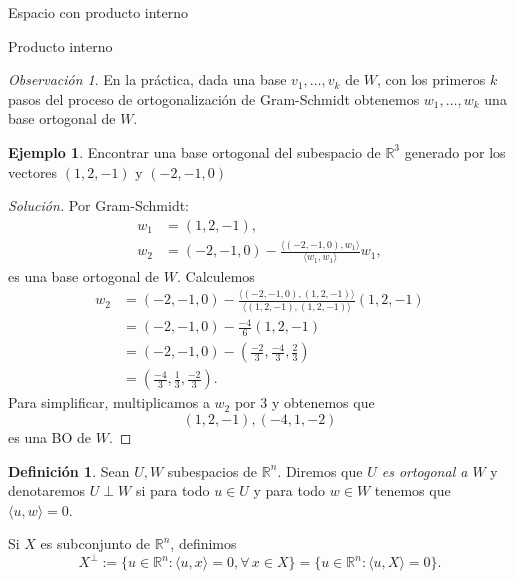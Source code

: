 \documentclass[a4paper,12pt,twoside,spanish,reqno]{amsbook}
\theoremstyle{definition}
\newtheorem{definicion}{Definici\'on}[section]
\newtheorem{ejemplo}{Ejemplo}[section]
\theoremstyle{remark}
\newtheorem{obs}{Observaci\'on}[section]
\newcommand{\la}{\langle}
\newcommand{\ra}{\rangle}
\newcommand{\R}{\mathbb R}
\begin{document}
\begin{chapter}{Espacio con producto interno}
\begin{section}{Producto interno}
\begin{obs}
        En la práctica, dada una base $v_1,\ldots,v_k$ de $W$,  con los primeros $k$ pasos del proceso de ortogonalización de Gram-Schmidt obtenemos $ w_{1},\ldots,w_k $ una base ortogonal de $W$.
        \end{obs}
        
        \begin{ejemplo}
            Encontrar una base ortogonal del subespacio de $\R^3$ generado por los vectores $(1,2,-1)$ y $(-2,-1,0)$
            \begin{proof}[Solución] Por Gram-Schmidt:
                \begin{align*}
                w_1 &= (1,2,-1),  \\
                w_2 &= (-2,-1,0) - \frac{\la (-2,-1,0),w_1\ra}{\la w_1,w_1\ra}w_1,
                \end{align*}
                es una base ortogonal de $W$. Calculemos 
                \begin{align*}
                    w_2  &= (-2,-1,0) - \frac{\la (-2,-1,0),(1,2,-1)\ra}{\la(1,2,-1),(1,2,-1)\ra}(1,2,-1)\\
                    &= (-2,-1,0) - \frac{-4}{6}(1,2,-1) \\
                    &= (-2,-1,0) - (\frac{-2}{3},\frac{-4}{3},\frac{2}{3}) \\
                    &= (\frac{-4}{3},\frac{1}{3},\frac{-2}{3}).
                \end{align*}
                Para simplificar, multiplicamos a $w_2$ por $3$ y obtenemos que
                \begin{equation*}
                    (1,2,-1), (-4,1,-2)
                \end{equation*} 
                es una BO de $W$. 
                
            \end{proof}  
        \end{ejemplo}
        
        \medskip
        
        \begin{definicion}  Sean $U, W$ subespacios de $\R^n$. Diremos que \textit{$U$ es ortogonal a $W$} y denotaremos $U \perp W$ si  para todo $u \in U$ y para todo $w \in W$ tenemos que $ \la u,w\ra =0$. 
            
            Si $X$ es subconjunto de $\R^n$,  definimos 
            $$
            X^\perp := \{u \in \R^n: \la u,x\ra = 0, \forall\, x \in X\} = \{u \in \R^n: \la u,X\ra = 0\}.
            $$ 
        \end{definicion}
        

\end{section}
\end{chapter}
\end{document}

